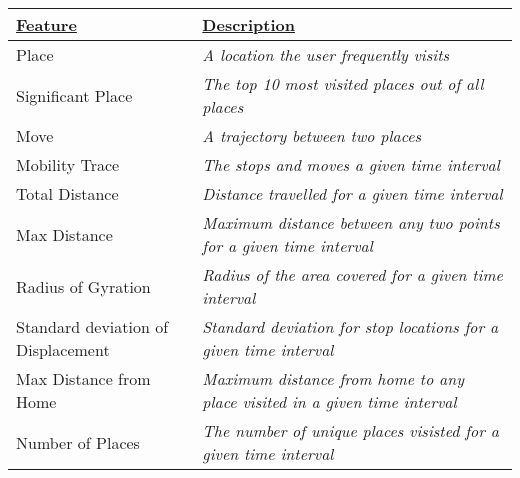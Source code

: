 \begin{table}[h]
    \centering
\begin{tabular}{|p{}|p{}|}
\hline
{\ul \textbf{Feature}}       & {\ul \textbf{Description}}                                                                                                                                        \\ \hline
Place                        & \textit{A location the user frequently visits}                                                                                                                    \\ \hline
Significant Place            & \textit{The top 10 most visited places out of all places}                                                                                  \\ \hline
Move                         & \textit{A trajectory between two places}                                                                                                                          \\ \hline
Mobility Trace               & \textit{The stops and moves a given time interval}                                                                                                                \\ \hline
Total Distance               & \textit{Distance travelled for a given time interval}                                                                                                             \\ \hline
Max Distance                 & \textit{Maximum distance between any two points for a given time interval}                                                                                        \\ \hline
Radius of Gyration           & \textit{Radius of the area covered for a given time interval}                                                                                                     \\ \hline
Standard deviation of Displacement         & \textit{Standard deviation for stop locations for a given time interval}                                                                                          \\ \hline
Max Distance from Home       & \textit{Maximum distance from home to any place visited in a given time interval}                                                                                 \\ \hline
Number of Places             & \textit{The number of unique places visisted for a given time interval}                                                                                           \\ \hline

\end{tabular}
\end{table}
